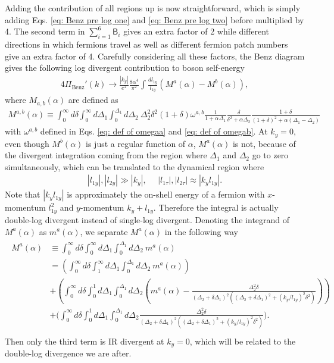 \documentclass[prx,amsmath,amssymb, notitlepage, onecolumn,
nofootinbib,
superscriptaddress,
longbibliography
]{revtex4-1}
\newcommand{\beq}{\begin{eqnarray}}
\newcommand{\eeq}{\end{eqnarray}}
\begin{document}
Adding the contribution of all regions up is now straightforward, which is simply adding Eqs. \eqref{eq: Benz pre log one} and \eqref{eq: Benz pre log two} before multiplied by 4. The second term in $\sum_{i=1}^6\mathsf{B}_i$ gives an extra factor of 2 while different directions in which fermions travel as well as different fermion patch numbers give an extra factor of 4. 
Carefully considering all these factors, the Benz diagram gives the following log divergent contribution to boson self-energy
\beq
4\Pi_{\text{Benz}}'(k)\rightarrow \frac{|k_y|}{e^2}\frac{8\alpha^4}{\pi^2}\int\frac{d l_{1y}}{l_{1y}}(M^a(\alpha)-M^b(\alpha)),
\eeq
where $M_{a,b}(\alpha)$ are defined as
\beq
M^{a,b}(\alpha) \equiv \int_0^\infty d \delta \int_0^\infty d \Delta_1 \int_0^{\Delta_1} d \Delta_2~\Delta_2^2\delta^2(1+\delta)\omega^{a,b}\frac{1}{1 + \alpha\Delta_1}\frac{\delta}{\delta^{2} + \alpha\Delta_2}\frac{1+\delta}{(1+\delta)^2 +\alpha(\Delta_1-\Delta_2)}
\eeq
with $\omega^{a,b}$ defined in Eqs. \eqref{eq: def of omegaa} and \eqref{eq: def of omegab}.
%
At $k_y=0$, even though $M^b(\alpha)$ is just a regular function of $\alpha$, $M^a(\alpha)$ is not, because of the divergent integration coming from the region where $\Delta_1$ and $\Delta_2$ go to zero simultaneously, which can be translated to the dynamical region where 
\beq\label{eq: double log region}
|l_{1y}|, |l_{2y}| \gg |k_y|,~~~~~~|l_{1\tau}|, |l_{2\tau}| \approx |k_yl_{1y}|.
\eeq
Note that $|k_yl_{1y}|$ is approximately the on-shell energy of a fermion with $x$-momentum $l_{1y}^2$ and $y$-momentum $k_y+l_{1y}$. Therefore the integral is actually double-log divergent instead of single-log divergent.
%
Denoting the integrand of $M^a(\alpha)$ as $m^a(\alpha)$, we separate $M^a(\alpha)$ in the following way
\beq\label{eq: extracting double log Benz}
\begin{split}
M^a(\alpha)&\equiv\int_0^\infty d \delta \int_0^\infty d \Delta_1 \int_0^{\Delta_1} d \Delta_2~m^a(\alpha)\\
&= \left(\int_0^\infty d \delta \int_1^\infty d \Delta_1 \int_0^{\Delta_1} d \Delta_2~m^a(\alpha)\right) \\
&+ \left(\int_0^\infty d \delta \int_0^1 d \Delta_1 \int_0^{\Delta_1} d \Delta_2 \left(m^a(\alpha)-\frac{\Delta_2^2\delta}{(\Delta_2+\delta  \Delta_1)^2\left((\Delta_2+\delta  \Delta_1)^2 + (k_y/l_{1y})^2\delta^2\right)}\right)\right) \\
&+\Bigg(\int_0^\infty d \delta \int_0^1 d \Delta_1 \int_0^{\Delta_1} d\Delta_2 \frac{\Delta_2^2\delta}{(\Delta_2+\delta  \Delta_1)^2\left((\Delta_2+\delta  \Delta_1)^2 + (k_y/l_{1y})^2\delta^2\right)}\Bigg).
\\
\end{split}
\eeq
Then only the third term is IR divergent at $k_y=0$, which will be related to the double-log divergence we are after. 
\end{document}
